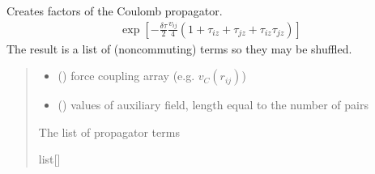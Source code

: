 \documentclass[letterpaper,10pt,english]{sphinxmanual}
\begin{document}
\begin{fulllineitems}
\begin{fulllineitems}
\label{\detokenize{spinbox:spinbox.core.HilbertPropagatorHS.factors_coulomb}}
\pysigstartsignatures
{}
\pysigstopsignatures
\sphinxAtStartPar
Creates factors of the Coulomb propagator.
\begin{equation*}
\begin{split}\exp \left[ -\frac{\delta\tau}{2} \frac{v_{ij}}{4} (1+\tau_{iz}+ \tau_{jz} + \tau_{iz}\tau_{jz} ) \right] \end{split}
\end{equation*}
\sphinxAtStartPar
The result is a list of (noncommuting) terms so they may be shuffled.
\begin{quote}\begin{description}
\begin{itemize}
\item {} 
\sphinxAtStartPar
{} ({\hyperref[\detokenize{spinbox:spinbox.core.Coupling}]{}}) \textendash{} force coupling array (e.g. \(v_C(r_{ij})\))

\item {} 
\sphinxAtStartPar
{} () \textendash{} values of auxiliary field, length equal to the number of pairs

\end{itemize}

\sphinxAtStartPar
The list of propagator terms

\sphinxAtStartPar
list{[}{\hyperref[\detokenize{spinbox:spinbox.core.HilbertOperator}]{}}{]}

\end{description}\end{quote}

\end{fulllineitems}


\end{fulllineitems}
\end{document}
